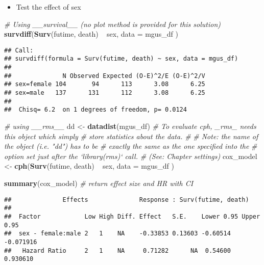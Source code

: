 \documentclass[]{book}
\newenvironment{Shaded}{\begin{snugshade}}{\end{snugshade}}
\newcommand{\KeywordTok}[1]{\textcolor[rgb]{0.13,0.29,0.53}{\textbf{{#1}}}}
\newcommand{\DataTypeTok}[1]{\textcolor[rgb]{0.13,0.29,0.53}{{#1}}}
\newcommand{\StringTok}[1]{\textcolor[rgb]{0.31,0.60,0.02}{{#1}}}
\newcommand{\CommentTok}[1]{\textcolor[rgb]{0.56,0.35,0.01}{\textit{{#1}}}}
\newcommand{\NormalTok}[1]{{#1}}
\providecommand{\tightlist}{%
  \setlength{\itemsep}{0pt}\setlength{\parskip}{0pt}}
\theoremstyle{definition}
\theoremstyle{definition}
\theoremstyle{definition}
\theoremstyle{remark}
\begin{document}
\begin{itemize}
\tightlist
\item
  Test the effect of sex
\end{itemize}

\begin{Shaded}
\begin{Highlighting}[]
\CommentTok{# Using __survival__ (no plot method is provided for this solution)}
\KeywordTok{survdiff}\NormalTok{(}\KeywordTok{Surv}\NormalTok{(futime, death) ~}\StringTok{ }\NormalTok{sex,}
  \DataTypeTok{data =} \NormalTok{mgus_df}
\NormalTok{)}
\end{Highlighting}
\end{Shaded}

\begin{verbatim}
## Call:
## survdiff(formula = Surv(futime, death) ~ sex, data = mgus_df)
## 
##              N Observed Expected (O-E)^2/E (O-E)^2/V
## sex=female 104       94      113      3.08      6.25
## sex=male   137      131      112      3.08      6.25
## 
##  Chisq= 6.2  on 1 degrees of freedom, p= 0.0124
\end{verbatim}

\begin{Shaded}
\begin{Highlighting}[]
\CommentTok{# using __rms__}
\NormalTok{dd <-}\StringTok{ }\KeywordTok{datadist}\NormalTok{(mgus_df)  }\CommentTok{# To evaluate cph, _rms_ needs this object which simply}
                         \CommentTok{# store statistics about the data.}
                         \CommentTok{# }
                         \CommentTok{# Note: the name of the object (i.e. "dd") has to be }
                         \CommentTok{#       exactly the same as the one specified into the}
                         \CommentTok{#       option set just after the `library(rms)` call.}
                         \CommentTok{#       (See: Chapter settings) }
\NormalTok{cox_model <-}\StringTok{ }\KeywordTok{cph}\NormalTok{(}\KeywordTok{Surv}\NormalTok{(futime, death) ~}\StringTok{ }\NormalTok{sex,}
  \DataTypeTok{data  =} \NormalTok{mgus_df}
\NormalTok{)}

\KeywordTok{summary}\NormalTok{(cox_model)                           }\CommentTok{# return effect size and HR with CI}
\end{Highlighting}
\end{Shaded}

\begin{verbatim}
##              Effects              Response : Surv(futime, death) 
## 
##  Factor            Low High Diff. Effect   S.E.    Lower 0.95 Upper 0.95
##  sex - female:male 2   1    NA    -0.33853 0.13603 -0.60514   -0.071916 
##   Hazard Ratio     2   1    NA     0.71282      NA  0.54600    0.930610
\end{verbatim}
\end{document}
